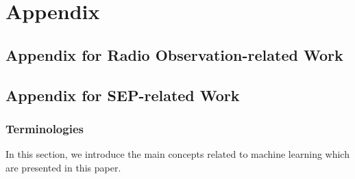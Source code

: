 \chapter{Appendix}
\label{appendix}

\section{Appendix for Radio Observation-related Work}
\label{ch3_appendix_lofar_psp}



\section{Appendix for SEP-related Work}
\label{ch4_appendix_eval}

\subsection{Terminologies}
\label{terminologies_appendix}
In this section, we introduce the main concepts related to machine learning which are presented in this paper.

